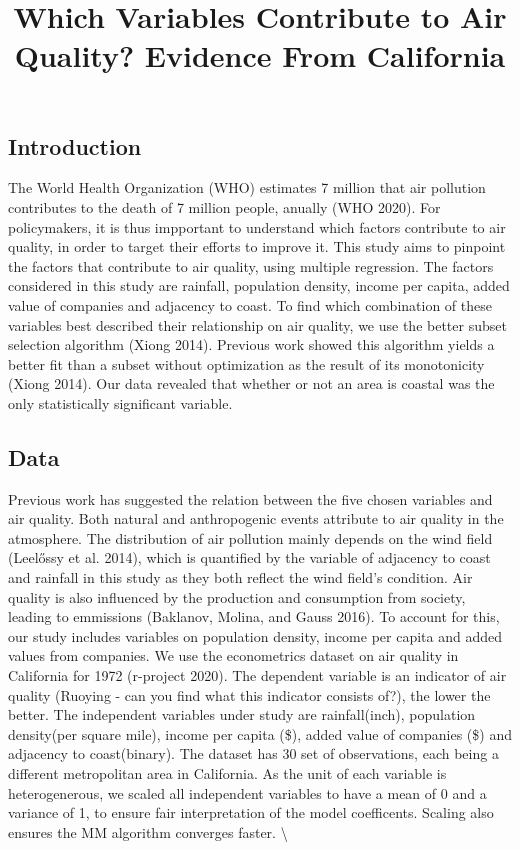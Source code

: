 \documentclass[
]{article}
\title{Which Variables Contribute to Air Quality? Evidence From California}
\author{}
\date{\vspace{-2.5em}}
\begin{document}
\maketitle

\hypertarget{introduction}{%
\subsection{Introduction}\label{introduction}}

The World Health Organization (WHO) estimates 7 million that air
pollution contributes to the death of 7 million people, anually (WHO
2020). For policymakers, it is thus impportant to understand which
factors contribute to air quality, in order to target their efforts to
improve it. This study aims to pinpoint the factors that contribute to
air quality, using multiple regression. The factors considered in this
study are rainfall, population density, income per capita, added value
of companies and adjacency to coast. To find which combination of these
variables best described their relationship on air quality, we use the
better subset selection algorithm (Xiong 2014). Previous work showed
this algorithm yields a better fit than a subset without optimization as
the result of its monotonicity (Xiong 2014). Our data revealed that
whether or not an area is coastal was the only statistically significant
variable.

\hypertarget{Data}{%
\subsection{Data}\label{Data}}

Previous work has suggested the relation between the five chosen
variables and air quality. Both natural and anthropogenic events
attribute to air quality in the atmosphere. The distribution of air
pollution mainly depends on the wind field (Leelőssy et al. 2014), which
is quantified by the variable of adjacency to coast and rainfall in this
study as they both reflect the wind field's condition. Air quality is
also influenced by the production and consumption from society, leading
to emmissions (Baklanov, Molina, and Gauss 2016). To account for this,
our study includes variables on population density, income per capita
and added values from companies. We use the econometrics dataset on air
quality in California for 1972 (r-project 2020). The dependent variable
is an indicator of air quality (Ruoying - can you find what this
indicator consists of?), the lower the better. The independent variables
under study are rainfall(inch), population density(per square mile),
income per capita (\$), added value of companies (\$) and adjacency to
coast(binary). The dataset has 30 set of observations, each being a
different metropolitan area in California. As the unit of each variable
is heterogenerous, we scaled all independent variables to have a mean of
0 and a variance of 1, to ensure fair interpretation of the model
coefficents. Scaling also ensures the MM algorithm converges faster.
\textbackslash{}
\end{document}
